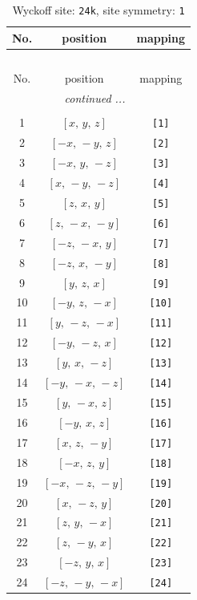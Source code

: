 \documentclass[fleqn,8pt]{jsarticle}
\begin{document}
\begin{longtable}{ccc}
\caption{Wyckoff site: {\tt 24k}, site symmetry: {\tt 1}}
 \\
 \hline \hline
No. & position & mapping \\ \hline \endfirsthead

\multicolumn{2}{l}{\tablename\ \thetable{}} \\
 \hline \hline
No. & position & mapping \\ \hline \endhead

 \hline \hline
\multicolumn{2}{r}{\footnotesize\it continued ...} \\ \endfoot

 \hline \hline
\multicolumn{2}{r}{} \\ \endlastfoot

1 & $\left[ x,\, y,\, z \right]$ & {\tt [1]} \\ \hline
2 & $\left[ - x,\, - y,\, z \right]$ & {\tt [2]} \\ \hline
3 & $\left[ - x,\, y,\, - z \right]$ & {\tt [3]} \\ \hline
4 & $\left[ x,\, - y,\, - z \right]$ & {\tt [4]} \\ \hline
5 & $\left[ z,\, x,\, y \right]$ & {\tt [5]} \\ \hline
6 & $\left[ z,\, - x,\, - y \right]$ & {\tt [6]} \\ \hline
7 & $\left[ - z,\, - x,\, y \right]$ & {\tt [7]} \\ \hline
8 & $\left[ - z,\, x,\, - y \right]$ & {\tt [8]} \\ \hline
9 & $\left[ y,\, z,\, x \right]$ & {\tt [9]} \\ \hline
10 & $\left[ - y,\, z,\, - x \right]$ & {\tt [10]} \\ \hline
11 & $\left[ y,\, - z,\, - x \right]$ & {\tt [11]} \\ \hline
12 & $\left[ - y,\, - z,\, x \right]$ & {\tt [12]} \\ \hline
13 & $\left[ y,\, x,\, - z \right]$ & {\tt [13]} \\ \hline
14 & $\left[ - y,\, - x,\, - z \right]$ & {\tt [14]} \\ \hline
15 & $\left[ y,\, - x,\, z \right]$ & {\tt [15]} \\ \hline
16 & $\left[ - y,\, x,\, z \right]$ & {\tt [16]} \\ \hline
17 & $\left[ x,\, z,\, - y \right]$ & {\tt [17]} \\ \hline
18 & $\left[ - x,\, z,\, y \right]$ & {\tt [18]} \\ \hline
19 & $\left[ - x,\, - z,\, - y \right]$ & {\tt [19]} \\ \hline
20 & $\left[ x,\, - z,\, y \right]$ & {\tt [20]} \\ \hline
21 & $\left[ z,\, y,\, - x \right]$ & {\tt [21]} \\ \hline
22 & $\left[ z,\, - y,\, x \right]$ & {\tt [22]} \\ \hline
23 & $\left[ - z,\, y,\, x \right]$ & {\tt [23]} \\ \hline
24 & $\left[ - z,\, - y,\, - x \right]$ & {\tt [24]} \\
\end{longtable}
\end{document}
